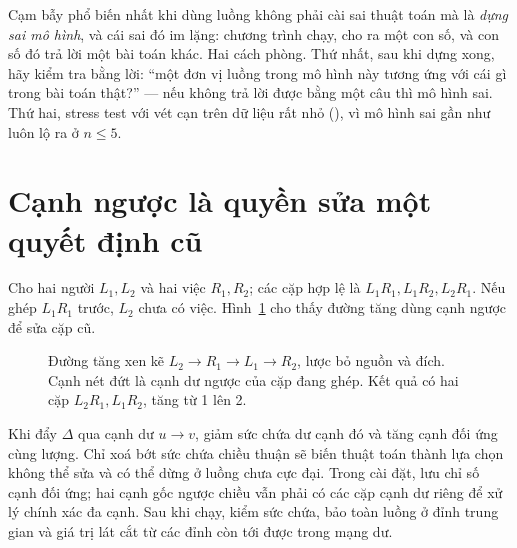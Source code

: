 \documentclass[../../algorithm.tex]{subfiles}
\begin{document}
\begin{cambay}
Cạm bẫy phổ biến nhất khi dùng luồng không phải cài sai thuật toán mà là \emph{dựng sai mô hình}, và cái sai đó im lặng: chương trình chạy, cho ra một con số, và con số đó trả lời một bài toán khác. Hai cách phòng. Thứ nhất, sau khi dựng xong, hãy kiểm tra bằng lời: ``một đơn vị luồng trong mô hình này tương ứng với cái gì trong bài toán thật?'' --- nếu không trả lời được bằng một câu thì mô hình sai. Thứ hai, stress test với vét cạn trên dữ liệu rất nhỏ (), vì mô hình sai gần như luôn lộ ra ở \(n \le 5\).
\end{cambay}


\section{Cạnh ngược là quyền sửa một quyết định cũ}

Cho hai người \(L_1,L_2\) và hai việc \(R_1,R_2\); các cặp hợp lệ là \(L_1R_1,L_1R_2,L_2R_1\).
Nếu ghép \(L_1R_1\) trước, \(L_2\) chưa có việc. Hình~\ref{fig:review-residual} cho thấy đường tăng dùng cạnh ngược để sửa cặp cũ.

\begin{figure}[H]\centering
{}
\caption{Đường tăng xen kẽ \(L_2\to R_1\to L_1\to R_2\), lược bỏ nguồn và đích. Cạnh nét đứt là cạnh dư ngược của cặp đang ghép. Kết quả có hai cặp \(L_2R_1,L_1R_2\), tăng từ 1 lên 2.}
\label{fig:review-residual}
\end{figure}

Khi đẩy \(\Delta\) qua cạnh dư \(u\to v\), giảm sức chứa dư cạnh đó và tăng cạnh đối ứng cùng lượng.
Chỉ xoá bớt sức chứa chiều thuận sẽ biến thuật toán thành lựa chọn không thể sửa và có thể dừng ở luồng chưa cực đại.
Trong cài đặt, lưu chỉ số cạnh đối ứng; hai cạnh gốc ngược chiều vẫn phải có các cặp cạnh dư riêng để xử lý chính xác đa cạnh.
Sau khi chạy, kiểm sức chứa, bảo toàn luồng ở đỉnh trung gian và giá trị lát cắt từ các đỉnh còn tới được trong mạng dư.
\end{document}
